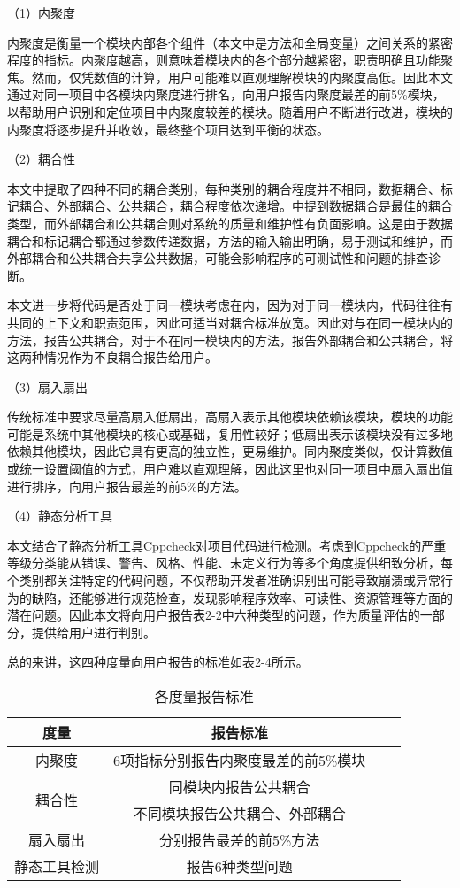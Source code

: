 （1）内聚度

内聚度是衡量一个模块内部各个组件（本文中是方法和全局变量）之间关系的紧密程度的指标。内聚度越高，则意味着模块内的各个部分越紧密，职责明确且功能聚焦。然而，仅凭数值的计算，用户可能难以直观理解模块的内聚度高低。因此本文通过对同一项目中各模块内聚度进行排名，向用户报告内聚度最差的前5\%模块，以帮助用户识别和定位项目中内聚度较差的模块。随着用户不断进行改进，模块的内聚度将逐步提升并收敛，最终整个项目达到平衡的状态。

（2）耦合性

本文中提取了四种不同的耦合类别，每种类别的耦合程度并不相同，数据耦合、标记耦合、外部耦合、公共耦合，耦合程度依次递增。中提到数据耦合是最佳的耦合类型，而外部耦合和公共耦合则对系统的质量和维护性有负面影响。这是由于数据耦合和标记耦合都通过参数传递数据，方法的输入输出明确，易于测试和维护，而外部耦合和公共耦合共享公共数据，可能会影响程序的可测试性和问题的排查诊断。

本文进一步将代码是否处于同一模块考虑在内，因为对于同一模块内，代码往往有共同的上下文和职责范围，因此可适当对耦合标准放宽。因此对与在同一模块内的方法，报告公共耦合，对于不在同一模块内的方法，报告外部耦合和公共耦合，将这两种情况作为不良耦合报告给用户。

（3）扇入扇出

传统标准中要求尽量高扇入低扇出，高扇入表示其他模块依赖该模块，模块的功能可能是系统中其他模块的核心或基础，复用性较好；低扇出表示该模块没有过多地依赖其他模块，因此它具有更高的独立性，更易维护。同内聚度类似，仅计算数值或统一设置阈值的方式，用户难以直观理解，因此这里也对同一项目中扇入扇出值进行排序，向用户报告最差的前5\%的方法。

（4）静态分析工具

本文结合了静态分析工具Cppcheck对项目代码进行检测。考虑到Cppcheck的严重等级分类能从错误、警告、风格、性能、未定义行为等多个角度提供细致分析，每个类别都关注特定的代码问题，不仅帮助开发者准确识别出可能导致崩溃或异常行为的缺陷，还能够进行规范检查，发现影响程序效率、可读性、资源管理等方面的潜在问题。因此本文将向用户报告表2-2中六种类型的问题，作为质量评估的一部分，提供给用户进行判别。

总的来讲，这四种度量向用户报告的标准如表2-4所示。

\begin{table}[htbp]
\caption{各度量报告标准}
\vspace{0.5em}\centering\wuhao
\begin{tabular}{cccc}
\toprule
度量 & 报告标准 \\
\midrule
内聚度 &  6项指标分别报告内聚度最差的前5\%模块 \\
\multirow{2}{*}{耦合性} &  同模块内报告公共耦合\\
                        & 不同模块报告公共耦合、外部耦合 \\
扇入扇出 & 分别报告最差的前5\%方法 \\
静态工具检测 &  报告6种类型问题\\ 
\bottomrule
\end{tabular}
\end{table}

